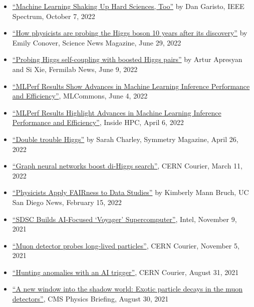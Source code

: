 \documentclass[11pt]{res}
\begin{document}
\begin{resume}
\begin{itemize}
    \item \href{https://spectrum.ieee.org/machine-learning-in-physics}{``Machine Learning Shaking Up Hard Sciences, Too''} by Dan Garisto, IEEE Spectrum, October 7, 2022
    \item \href{https://www.sciencenews.org/article/higgs-boson-particle-physics-standard-model-discovery-anniversary}{``How physicists are probing the Higgs boson 10 years after its discovery''} by Emily Conover, Science News Magazine, June 29, 2022
    \item \href{https://news.fnal.gov/2022/06/probing-higgs-self-coupling-with-boosted-higgs-pairs/}{``Probing Higgs self-coupling with boosted Higgs pairs''} by Artur Apresyan and Si Xie, Fermilab News, June 9, 2022
    \item \href{https://mlcommons.org/en/news/mlperf-inference-1q2022/}{``MLPerf Results Show Advances in Machine Learning Inference Performance and Efficiency''}, MLCommons, June 4, 2022
    \item \href{https://insidehpc.com/2022/04/mlperf-results-highlight-advances-in-machine-learning-inference-performance-and-efficiency/}{``MLPerf Results Highlight Advances in Machine Learning Inference Performance and Efficiency''}, Inside HPC, April 6, 2022
    \item \href{https://www.symmetrymagazine.org/article/double-trouble-higgs}{``Double trouble Higgs''} by Sarah Charley, Symmetry Magazine, April 26, 2022
    \item \href{https://cerncourier.com/a/graph-neural-networks-boost-di-higgs-search/}{``Graph neural networks boost di-Higgs search''}, CERN Courier, March 11, 2022
    \item \href{https://ucsdnews.ucsd.edu/pressrelease/physicists-apply-fairness-to-data-studies}{``Physicists Apply FAIRness to Data Studies''} by Kimberly Mann Bruch, UC San Diego News, February 15, 2022
    \item \href{https://www.intel.com/content/www/us/en/customer-spotlight/stories/san-diego-supercomputer-customer-story.html}{``SDSC Builds AI-Focused `Voyager' Supercomputer''}, Intel, November 9, 2021
    \item \href{https://cerncourier.com/a/muon-detector-probes-long-lived-particles/}{``Muon detector probes long-lived particles''}, CERN Courier, November 5, 2021
    \item \href{https://cerncourier.com/a/hunting-anomalies-with-an-ai-trigger/}{``Hunting anomalies with an AI trigger''}, CERN Courier, August 31, 2021
    \item \href{https://cms.cern/news/new-window-shadow-world-exotic-particle-decays-muon-detectors}{``A new window into the shadow world: Exotic particle decays in the muon detectors''}, CMS Physics Briefing, August 30, 2021

\end{itemize}
\end{resume}
\end{document}
